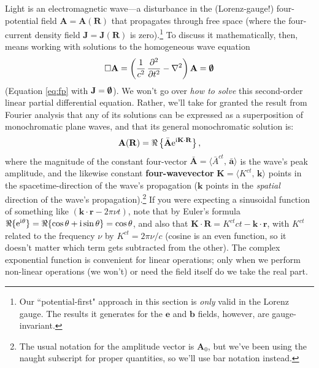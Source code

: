 \documentclass[12pt]{article}
\renewcommand{\vv}[1]{\mathbf{#1}}
\begin{document}
Light is an electromagnetic wave---a disturbance in the (Lorenz-gauge!) four-potential field $\vv A = \vv A (\vv R)$ that propagates through free space (where the four-current density field $\vv J = \vv J (\vv R)$ is zero).\footnote{Our ``potential-first" approach in this section is \emph{only} valid in the Lorenz gauge. The results it generates for the $\vv e$ and $\vv b$ fields, however, are gauge-invariant.} To discuss it mathematically, then, means working with solutions to the homogeneous wave equation
\begin{equation*}
\Box \vv A =  \left( \dfrac{1}{c^2} \, \dfrac{\partial^2}{\partial t^2} - \nabla ^2 \right) \vv A = \textrm{\mbox{\boldmath $\emptyset$}}
\end{equation*}
(Equation \ref{eq:fp} with $\vv J = \textrm{\mbox{\boldmath$\emptyset$}}$). We won't go over \emph{how to solve} this second-order linear partial differential equation. Rather, we'll take for granted the result from Fourier analysis that any of its solutions can be expressed as a superposition of monochromatic plane waves, and that its general monochromatic solution is:
\begin{equation}\label{eq:pw}
\vv A (\vv R) = \Re \left \lbrace \bar{\vv A} \mathrm{e}^{\mathrm{i} \mkern.5mu \vv K \cdot \vv R} \right \rbrace ,
\end{equation}
where the magnitude of the constant four-vector $\bar{\vv A} = \langle \bar{A}^{ct}, \, \bar{\vv a} \rangle$ is the wave's peak amplitude, and the likewise constant \textbf{four-wavevector} ${\vv K = \langle K^{ct}, \, \vv k \rangle}$ points in the spacetime-direction of the wave's propagation ($\vv k$ points in the \emph{spatial} direction of the wave's propagation).\footnote{The usual notation for the amplitude vector is $\vv A_0$, but we've been using the naught subscript for proper quantities, so we'll use bar notation instead.} If you were expecting a sinusoidal function of something like $(\vv k \cdot \vv r - 2 \pi \nu t )$, note that by Euler's formula ${\Re \lbrace \mathrm{e}^{\mathrm{i} \mkern.5mu \theta} \rbrace = \Re \lbrace \cos \theta + \mathrm{i} \sin \theta \rbrace = \cos \theta}$, and also that $\vv K \cdot \vv R = K^{ct}ct - \vv k \cdot \vv r$, with $K^{ct}$ related to the frequency $\nu$ by $K^{ct} = 2 \pi \nu / c$ (cosine is an even function, so it doesn't matter which term gets subtracted from the other). The complex exponential function is convenient for linear operations; only when we perform non-linear operations (we won't) or need the field itself do we take the real part.
\end{document}
